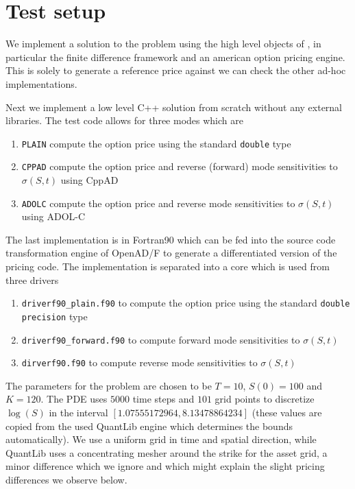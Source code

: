 \documentclass{amsart}
\theoremstyle{plain}
\numberwithin{equation}{section}
\begin{document}
\section{Test setup}

We implement a solution to the problem using the high level objects of \cite{ql}, in particular the finite difference framework and an american option pricing engine. This is solely to generate a reference price against we can check the other ad-hoc implementations.

Next we implement a low level C++ solution from scratch without any external libraries. The test code allows for three modes which are

\begin{enumerate}
\item \verb+PLAIN+ compute the option price using the standard \verb+double+ type
\item \verb+CPPAD+ compute the option price and reverse (forward) mode sensitivities to $\sigma(S,t)$ using CppAD
\item \verb+ADOLC+ compute the option price and reverse mode sensitivities to $\sigma(S,t)$ using ADOL-C
\end{enumerate}

The last implementation is in Fortran90 which can be fed into the source code transformation engine of OpenAD/F to generate a differentiated version of the pricing code. The implementation is separated into a core which is used from three drivers

\begin{enumerate}
\item \verb+driverf90_plain.f90+ to compute the option price using the standard \verb+double precision+ type
\item \verb+driverf90_forward.f90+ to compute forward mode sensitivities to $\sigma(S,t)$
\item \verb+dirverf90.f90+ to compute reverse mode sensitivities to $\sigma(S,t)$
\end{enumerate}

The parameters for the problem are chosen to be $T=10$, $S(0)=100$ and $K=120$. The PDE uses $5000$ time steps and $101$ grid points to discretize $\log(S)$ in the interval $[1.07555172964,8.13478864234]$ (these values are copied from the used QuantLib engine which determines the bounds automatically). We use a uniform grid in time and spatial direction, while QuantLib uses a concentrating mesher around the strike for the asset grid, a minor difference which we ignore and which might explain the slight pricing differences we observe below.
\end{document}
